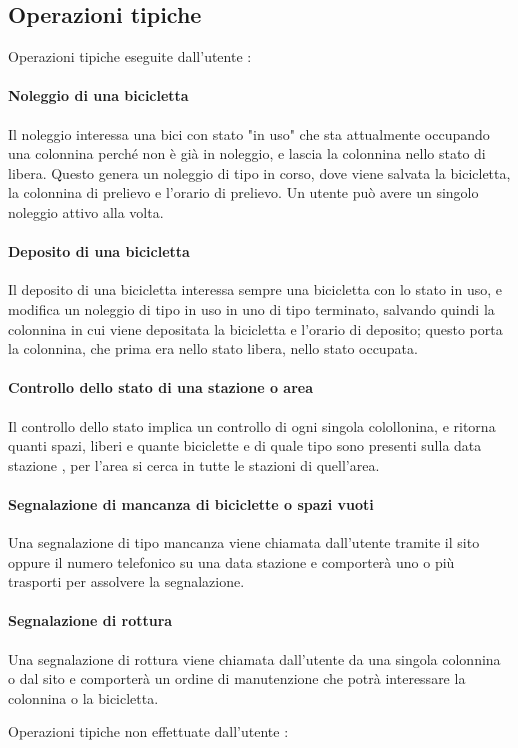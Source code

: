 \documentclass[a4paper,twoside]{article}
\begin{document}
\subsection{Operazioni tipiche}
Operazioni tipiche eseguite dall'utente :
\paragraph{Noleggio di una bicicletta} Il noleggio interessa una bici con stato "in uso" che sta attualmente occupando una colonnina perché non è già in noleggio, e lascia la colonnina nello stato di libera. Questo genera un noleggio di tipo in corso, dove viene salvata la bicicletta, la colonnina di prelievo e l'orario di prelievo. Un utente può avere un singolo noleggio attivo alla volta.
\paragraph{Deposito di una bicicletta} Il deposito di una bicicletta interessa sempre una bicicletta con lo stato in uso, e modifica un noleggio di tipo in uso in uno di tipo terminato, salvando quindi la colonnina in cui viene depositata la bicicletta e l'orario di deposito; questo porta la colonnina, che prima era nello stato libera, nello stato occupata.
\paragraph{Controllo dello stato di una stazione o area} Il controllo dello stato implica un controllo di ogni singola colollonina, e ritorna quanti spazi, liberi e quante biciclette e di quale tipo sono presenti sulla data stazione , per l'area si cerca in tutte le stazioni di quell'area.
\paragraph{Segnalazione di mancanza di biciclette o spazi vuoti} Una segnalazione di tipo mancanza viene chiamata dall'utente tramite il sito oppure il numero telefonico su una data stazione e comporterà uno o più trasporti per assolvere la segnalazione.
\paragraph{Segnalazione di rottura} Una segnalazione di rottura viene chiamata dall'utente da una singola colonnina o dal sito e comporterà un ordine di manutenzione che potrà interessare la colonnina o la bicicletta.
\par Operazioni tipiche non effettuate dall'utente :
\end{document}
